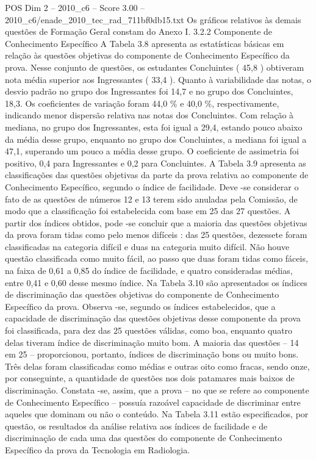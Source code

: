 \begin{textsample}{POS Dim 2 – 2010\_c6 – Score 3.00 – 2010\_c6/enade\_2010\_tec\_rad\_711bf0db15.txt}
Os gráficos relativos às demais questões de Formação Geral constam do Anexo I. 3.2.2 Componente de Conhecimento Específico A Tabela 3.8 apresenta as estatísticas básicas em relação às questões objetivas do componente de Conhecimento Específico da prova.
Nesse conjunto de questões, os estudantes Concluintes ( 45,8 ) obtiveram nota média superior aos Ingressantes ( 33,4 ).
Quanto à variabilidade das notas, o desvio padrão no grupo dos Ingressantes foi 14,7 e no grupo dos Concluintes, 18,3.
Os coeficientes de variação foram 44,0 \% e 40,0 \%, respectivamente, indicando menor dispersão relativa nas notas dos Concluintes.
Com relação à mediana, no grupo dos Ingressantes, esta foi igual a 29,4, estando pouco abaixo da média desse grupo, enquanto no grupo dos Concluintes, a mediana foi igual a 47,1, superando um pouco a média desse grupo.
O coeficiente de assimetria foi positivo, 0,4 para Ingressantes e 0,2 para Concluintes.
A Tabela 3.9 apresenta as classificações das questões objetivas da parte da prova relativa ao componente de Conhecimento Específico, segundo o índice de facilidade.
Deve -se considerar o fato de as questões de números 12 e 13 terem sido anuladas pela Comissão, de modo que a classificação foi estabelecida com base em 25 das 27 questões.
A partir dos índices obtidos, pode -se concluir que a maioria das questões objetivas da prova foram tidas como pelo menos difíceis : das 25 questões, dezessete foram classificadas na categoria difícil e duas na categoria muito difícil.
Não houve questão classificada como muito fácil, ao passo que duas foram tidas como fáceis, na faixa de 0,61 a 0,85 do índice de facilidade, e quatro consideradas médias, entre 0,41 e 0,60 desse mesmo índice.
Na Tabela 3.10 são apresentados os índices de discriminação das questões objetivas do componente de Conhecimento Específico da prova.
Observa -se, segundo os índices estabelecidos, que a capacidade de discriminação das questões objetivas desse componente da prova foi classificada, para dez das 25 questões válidas, como boa, enquanto quatro delas tiveram índice de discriminação muito bom.
A maioria das questões – 14 em 25 – proporcionou, portanto, índices de discriminação bons ou muito bons.
Três delas foram classificadas como médias e outras oito como fracas, sendo onze, por conseguinte, a quantidade de questões nos dois patamares mais baixos de discriminação.
Constata -se, assim, que a prova – no que se refere ao componente de Conhecimento Específico – possuía razoável capacidade de discriminar entre aqueles que dominam ou não o conteúdo.
Na Tabela 3.11 estão especificados, por questão, os resultados da análise relativa aos índices de facilidade e de discriminação de cada uma das questões do componente de Conhecimento Específico da prova da Tecnologia em Radiologia.

\end{textsample}

